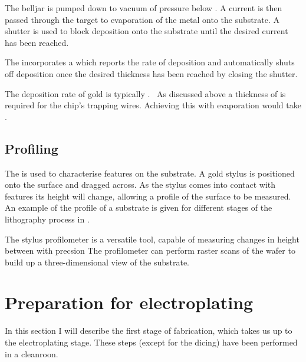 \begin{figure}
  \centering
  \caption{}
  \label{fab:fig:belljar}
\end{figure}


The belljar is pumped down to vacuum of pressure below . A current is
then passed through the target to  evaporation of the metal onto the
substrate. A shutter is used to block deposition onto the substrate until the
desired current has been reached.

The  incorporates a  which reports the rate of
deposition and automatically shuts off deposition once the desired thickness
has been reached by closing the shutter. 

The deposition rate of gold is typically .~\cite{} As discussed above 
a thickness of  is required for the chip's trapping wires. Achieving
this with evaporation would take . 

\subsection{Profiling}
\label{fab:profile}


The  is used to characterise features on
the substrate. A  gold stylus is positioned onto the surface and
dragged across. As the stylus comes into contact with features its height will
change, allowing a profile of the surface to be measured.~\cite{} An example of
the profile of a substrate is given for different stages of the lithography
process in .

The stylus profilometer is a versatile tool, capable of measuring changes in
height between  with precsion   The profilometer can perform raster scans of the wafer to
build up a three-dimensional view of the substrate.

\section{Preparation for electroplating}
\label{fab:prep}

In this section I will describe the first stage of fabrication, which takes us
up to the electroplating stage. These steps (except for the dicing) have been
performed in a cleanroon.

